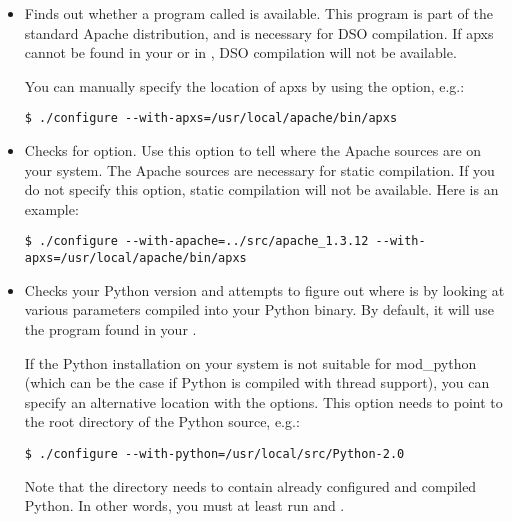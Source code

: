 \begin{itemize}

\item
{}
Finds out whether a program called  is available. This
program is part of the standard Apache distribution, and is necessary
for DSO compilation. If apxs cannot be found in your  or in
, DSO compilation will not be available.

You can manually specify the location of apxs by using the
 option, e.g.:

\begin{verbatim}
$ ./configure --with-apxs=/usr/local/apache/bin/apxs 	
\end{verbatim}

\item
Checks for  option. Use this option to
tell  where the Apache sources are on your
system. The Apache sources are necessary for static compilation. If
you do not specify this option, static compilation will not be
available. Here is an example:

\begin{verbatim}
$ ./configure --with-apache=../src/apache_1.3.12 --with-apxs=/usr/local/apache/bin/apxs
\end{verbatim}

\item
{}
Checks your Python version and attempts to figure out where
 is by looking at various parameters compiled into
your Python binary. By default, it will use the 
program found in your .

If the Python installation on your system is not suitable for
mod_python (which can be the case if Python is compiled with thread
support), you can specify an alternative location with the
 options. This option needs to point to
the root directory of the Python source, e.g.:

\begin{verbatim}
$ ./configure --with-python=/usr/local/src/Python-2.0
\end{verbatim}                      

Note that the directory needs to contain already configured and
compiled Python. In other words, you must at least run  and
.

\end{itemize}

